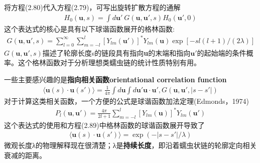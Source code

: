 \documentclass[12pt]{article}
\begin{document}
\begin{CJK}{UTF8}{gkai}
将方程(2.80)代入方程(2.79)，可写出旋转扩散方程的通解
\begin{gather}
H_0(\textbf{u},s)=\int d\textbf{u}'\ G(\textbf{u},\textbf{u}',s)H_0(\textbf{u}',0)
\end{gather}
这个表达式的核心是具有以下球谐函数展开的格林函数:\\
\begin{gather}
G(\textbf{u},\textbf{u}',s) = \sum_{l=0}^{\infty}\sum_{m=-l}^{l}\left[Y_{lm}(\textbf{u}')\right]^*Y_{lm}(\textbf{u})\exp[-sl(l+1)/(2\lambda)]
\end{gather}
$G(\textbf{u},\textbf{u}',s)$描述了轮廓长度s的链段具有指向\textbf{u}的末端和指向$\textbf{u}'$的起始端的条件概率。这个格林函数对于分析理想类蠕虫链的统计性质特别有用。

一些主要感兴趣的是\textbf{指向相关函数orientational correlation function}\\
\begin{gather}
\langle \textbf{u}(s)\cdot \textbf{u}(s')\rangle =\frac{1}{4\pi}\int d\textbf{u}\int d\textbf{u}'\textbf{u}\cdot \textbf{u}',G(\textbf{u},\textbf{u}',|s-s'|)
\end{gather}
对于计算这类相关函数，一个方便的公式是球谐函数加法定理(Edmonds，1974)\\
\begin{gather}
P_l(\textbf{u},\textbf{u}')=\frac{4\pi}{2l+1}\sum_{m=-l}^{l}[Y_{lm}(\textbf{u})]^*Y_{lm}(\textbf{u}')
\end{gather}
这个表达式的使用和方程(2.89)中格林函数的球谐函数展开导致了\\
\begin{gather}
\langle \textbf{u}(s) \cdot \textbf{u}(s')\rangle=\exp(-|s-s'|/\lambda)
\end{gather}
微观长度λ的物理解释现在很清楚；λ是\textbf{持续长度}，即沿着蠕虫状链的轮廓定向相关衰减的距离。\\


\end{CJK}
\end{document}
